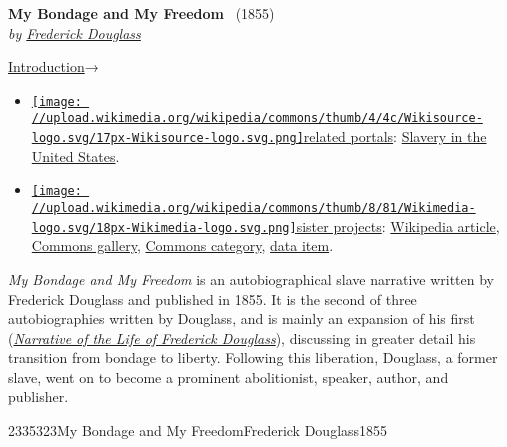 \hypertarget{headerContainer}{}
\hypertarget{navigationHeader}{}
\textbf{\protect\hypertarget{header_title_text}{}{My Bondage and My
Freedom}} ~(1855)~\\
\emph{by
\href{/wiki/Author:Frederick_Douglass}{\protect\hypertarget{header_author_text}{}{{Frederick
Douglass}}}}

\protect\hypertarget{headernext}{}{\href{/wiki/My_Bondage_and_My_Freedom_(1855)/Introduction}{Introduction}→}

\hypertarget{navigationNotes}{}
\begin{itemize}
\tightlist
\item
  {\href{/wiki/Portal:Portals}{\texttt{[image: //upload.wikimedia.org/wikipedia/commons/thumb/4/4c/Wikisource-logo.svg/17px-Wikisource-logo.svg.png]}}}\href{/wiki/Portal:Portals}{related
  portals}: \href{/wiki/Portal:Slavery_in_the_United_States}{Slavery in
  the United States}.
\item
  {\href{/wiki/Special:SiteMatrix}{\texttt{[image: //upload.wikimedia.org/wikipedia/commons/thumb/8/81/Wikimedia-logo.svg/18px-Wikimedia-logo.svg.png]}}}\href{/wiki/Special:SiteMatrix}{sister
  projects}:
  \href{https://en.wikipedia.org/wiki/My_Bondage_and_My_Freedom}{Wikipedia
  article},
  \href{https://commons.wikimedia.org/wiki/Category:My_Bondage_and_My_Freedom_(1855)}{Commons
  gallery},
  \href{https://commons.wikimedia.org/wiki/Category:My_Bondage_and_My_Freedom_(1855)}{Commons
  category}, \href{https://www.wikidata.org/wiki/Q38275623}{data item}.
\end{itemize}

\emph{My Bondage and My Freedom} is an autobiographical slave narrative
written by Frederick Douglass and published in 1855. It is the second of
three autobiographies written by Douglass, and is mainly an expansion of
his first
(\emph{\href{/wiki/Narrative_of_the_Life_of_Frederick_Douglass,_An_American_Slave}{Narrative
of the Life of Frederick Douglass}}), discussing in greater detail his
transition from bondage to liberty. Following this liberation, Douglass,
a former slave, went on to become a prominent abolitionist, speaker,
author, and publisher.

\hypertarget{ws-data}{}
\protect\hypertarget{ws-article-id}{}{2335323}\protect\hypertarget{ws-title}{}{My
Bondage and My Freedom}\protect\hypertarget{ws-author}{}{Frederick
Douglass}\protect\hypertarget{ws-year}{}{1855}

{\protect\hypertarget{Frontis}{}{}}

